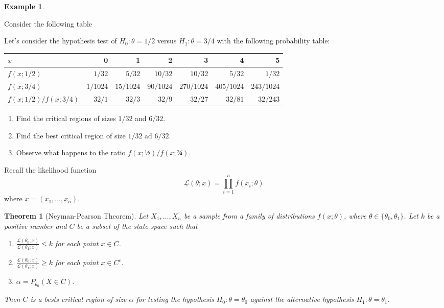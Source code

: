 \documentclass[
  openany]{book}
\providecommand{\tightlist}{%
  \setlength{\itemsep}{0pt}\setlength{\parskip}{0pt}}
\newtheorem{theorem}{Theorem}[chapter]
\theoremstyle{definition}
\theoremstyle{definition}
\newtheorem{example}{Example}[chapter]
\theoremstyle{definition}
\theoremstyle{definition}
\theoremstyle{remark}
\begin{document}
\begin{example}
\protect\hypertarget{exm:critical-region}{}\label{exm:critical-region}

Consider the following table

Let's consider the hypothesis test of \(H_0: \theta = 1/2\) versus
\(H_1: \theta = 3/4\)
with the following probability table:

\begin{longtable}[]{@{}lrrrrrr@{}}
\toprule
\(x\) & 0 & 1 & 2 & 3 & 4 & 5\tabularnewline
\midrule
\endhead
\(f(x ; 1 / 2)\) & \(1 / 32\) & \(5 / 32\) & \(10 / 32\) & \(10/32\) & \(5/32\) & \(1/32\)\tabularnewline
\(f(x ; 3 / 4)\) & \(1 / 1024\) & \(15 / 1024\) & \(90 / 1024\) & \(270/1024\) & \(405/1024\) & \(243/1024\)\tabularnewline
\(f(x ; 1 / 2) / f(x ; 3 / 4)\) & \(32 / 1\) & \(32 / 3\) & \(32 / 9\) & \(32/27\) & \(32/81\) & \(32/243\)\tabularnewline
\bottomrule
\end{longtable}

\begin{enumerate}
\def\labelenumi{\arabic{enumi}.}
\tightlist
\item
  Find the critical regions of sizes \(1/32\) and \(6/32\).
\item
  Find the best critical region of size \(1/32\) ad \(6/32\).
\item
  Observe what happens to the ratio \(f(x;½)/ f(x; ¾)\).
\end{enumerate}

\end{example}

Recall the likelihood function
\[\mathcal{L}(\theta;x) = \prod_{i=1}^n f(x_i;\theta)\]
where \(x = (x_1, \dots, x_n)\).

\begin{theorem}[Neyman-Pearson Theorem]
Let \(X_1, \dots, X_n\) be a sample from a family of distributions \(f(x;\theta)\),
where \(\theta \in \{\theta_0, \theta_1\}\).
Let \(k\) be a positive number and \(C\) be a subset of the state space such that

\begin{enumerate}
\def\labelenumi{\alph{enumi}.}
\tightlist
\item
  \(\displaystyle{\frac{\mathcal{L}(\theta_0;x)}{\mathcal{L}(\theta_1;x)}} \leq k\) for each point \(x\in C\).
\item
  \(\displaystyle\frac{\mathcal{L}(\theta_0;x)}{\mathcal{L}(\theta_1;x)} \geq k\) for each point \(x\in C^c\).
\item
  \(\alpha = P_{\theta_0}(X \in C)\).
\end{enumerate}

Then \(C\) is a bests critical region of size \(\alpha\) for testing the hypothesis
\(H_0: \theta= \theta_0\) against the alternative hypothesis \(H_1: \theta = \theta_1\).
\end{theorem}
\end{document}
